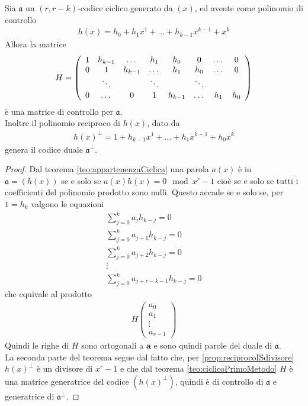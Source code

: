 \begin{teorema} \label{teo:poliControllo}
  Sia $\mathfrak{a}$ un $(r,r-k)$-codice ciclico generato da $(x)$, ed avente come polinomio di controllo
  \begin{align*}
     h(x) = h_{0} + h_{1}x^{1} + \dots + h_{k-1}x^{k-1} + x^{k}
  \end{align*}
  Allora la matrice
  \begin{align*}
      H =
      \left(
      \begin{array} {c c c c c c c c}
      1 & h_{k-1} & \dots & h_{1} & h_{0} & 0 & \dots & 0 \\
      0 & 1 & h_{k-1} & \dots & h_{1} & h_{0} & \dots & 0  \\
       & \ddots &  & \ddots &  & \ddots &  &     \\
      0 & \dots & 0 & 1 & h_{k-1} & \dots & h_{1} & h_{0}
      \end{array}
      \right)
   \end{align*}
   è una matrice di controllo per $\mathfrak{a}$. \\
   Inoltre il polinomio reciproco di $h(x)$, dato da
   \begin{align*}
     h(x)^{\perp} = 1 + h_{k-1}x^{1} + \dots + h_{1}x^{k-1} + h_{0}x^{k}
  \end{align*}
  genera il codice duale $\mathfrak{a}^{\perp}$.
\end{teorema}
\begin{proof}
   Dal teorema \ref{teo:appartenenzaCiclica} una parola $a(x)$ è in $\mathfrak{a} = (h(x))$ se e solo se $a(x)h(x)=0 \mod{x^r-1}$ cioè se e solo se tutti i coefficienti del polinomio prodotto sono nulli. Questo accade se e solo se, per $1 = h_{k}$ valgono le equazioni
   \begin{align*}
      \sum_{j = 0}^{k} a_{j} h_{k-j} = 0  \\
      \sum_{j = 0}^{k}  a_{j+1} h_{k-j} = 0  \\
      \sum_{j = 0}^{k} a_{j+2} h_{k-j} = 0 \\
      \vdots \\
      \sum_{j = 0}^{k}  a_{j+r-k-1} h_{k-j} = 0
    \end{align*}
    che equivale al prodotto
    \begin{align*}
       H
       \left(
	\begin{array} {c}
	a_0   \\
	a_1    \\
	\vdots   \\
	a_{r-1}
	\end{array}
	\right)
    \end{align*}
   Quindi le righe di $H$ sono ortogonali a $\mathbf{a}$ e sono quindi parole del duale di $\mathfrak{a}$.\\
   La seconda parte del teorema segue dal fatto che, per \ref{prop:reciprocoISdivisore} $h(x)^{\perp}$ è un divisore di $x^r - 1$ e che dal teorema \ref{teo:ciclicoPrimoMetodo} $H$ è una matrice generatrice del codice $(h(x)^{\perp})$, quindi è di controllo di $\mathfrak{a}$ e generatrice di $\mathfrak{a}^{\perp}$.
\end{proof}
